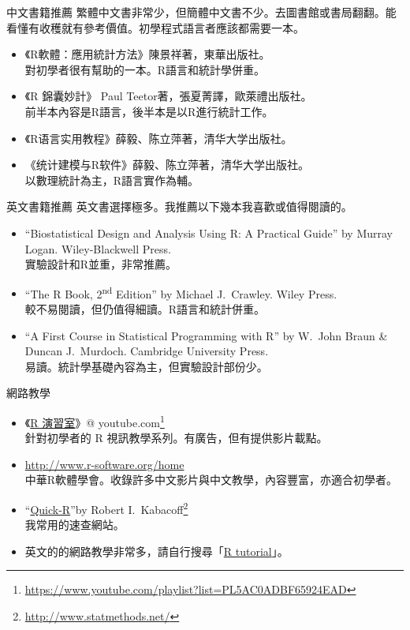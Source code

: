 \documentclass[14pt, aspectratio=43]{beamer}
\let\oldfootnote\footnote
\renewcommand\footnote[1]{\hspace{-0.7em}\oldfootnote{\ignorespaces#1}\hspace{0.5em}}
\begin{document}
\begin{frame}{中文書籍推薦}
繁體中文書非常少，但簡體中文書不少。去圖書館或書局翻翻。能看懂有收穫就有參考價值。初學程式語言者應該都需要一本。
\begin{itemize}
\item 《R軟體：應用統計方法》陳景祥著，東華出版社。\\ 對初學者很有幫助的一本。R語言和統計學併重。
\item 《R 錦囊妙計》 Paul Teetor著，張夏菁譯，歐萊禮出版社。\\ 前半本內容是R語言，後半本是以R進行統計工作。
\item {《R语言实用教程》薛毅、陈立萍著，清华大学出版社。}
\item {《统计建模与R软件》薛毅、陈立萍著，清华大学出版社。} \\ 以數理統計為主，R語言實作為輔。
\end{itemize}
\end{frame}

\begin{frame}{英文書籍推薦}
英文書選擇極多。我推薦以下幾本我喜歡或值得閱讀的。
\begin{itemize}
\item ``Biostatistical Design and Analysis Using R: A Practical Guide'' by Murray Logan. Wiley-Blackwell Press.\\ 實驗設計和R並重，非常推薦。
\item ``The R Book, 2\textsuperscript{nd} Edition'' by Michael J.~Crawley. Wiley Press. \\ 較不易閱讀，但仍值得細讀。R語言和統計併重。
\item ``A First Course in Statistical Programming with R'' by W.~John Braun \& Duncan J.~Murdoch. Cambridge University Press. \\ 易讀。統計學基礎內容為主，但實驗設計部份少。
\end{itemize}
\end{frame}


\begin{frame}{網路教學}
\begin{itemize}
\item 《\href{https://www.youtube.com/playlist?list=PL5AC0ADBF65924EAD}{R 演習室}》\makeatletter @ \makeatother youtube.com\oldfootnote{\url{https://www.youtube.com/playlist?list=PL5AC0ADBF65924EAD}} \\ 針對初學者的 R 視訊教學系列。有廣告，但有提供影片載點。
\item \url{http://www.r-software.org/home} \\ 中華R軟體學會。收錄許多中文影片與中文教學，內容豐富，亦適合初學者。
\item ``\href{http://www.statmethods.net/}{Quick-R}''by Robert I.~Kabacoff\oldfootnote{\url{http://www.statmethods.net/}}\\ 我常用的速查網站。
\item 英文的的網路教學非常多，請自行搜尋「\href{https://www.google.com/search?q=R+tutorial}{R tutorial}」。
\end{itemize}
\end{frame}
\end{document}
